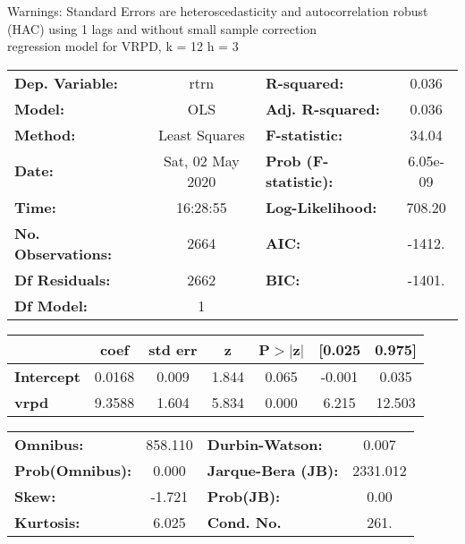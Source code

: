 Warnings: \newline
 [1] Standard Errors are heteroscedasticity and autocorrelation robust (HAC) using 1 lags and without small sample correction\\ 

regression model for VRPD, k = 12 h = 3\begin{center}
\begin{tabular}{lclc}
\toprule
\textbf{Dep. Variable:}    &       rtrn       & \textbf{  R-squared:         } &     0.036   \\
\textbf{Model:}            &       OLS        & \textbf{  Adj. R-squared:    } &     0.036   \\
\textbf{Method:}           &  Least Squares   & \textbf{  F-statistic:       } &     34.04   \\
\textbf{Date:}             & Sat, 02 May 2020 & \textbf{  Prob (F-statistic):} &  6.05e-09   \\
\textbf{Time:}             &     16:28:55     & \textbf{  Log-Likelihood:    } &    708.20   \\
\textbf{No. Observations:} &        2664      & \textbf{  AIC:               } &    -1412.   \\
\textbf{Df Residuals:}     &        2662      & \textbf{  BIC:               } &    -1401.   \\
\textbf{Df Model:}         &           1      & \textbf{                     } &             \\
\bottomrule
\end{tabular}
\begin{tabular}{lcccccc}
                   & \textbf{coef} & \textbf{std err} & \textbf{z} & \textbf{P$> |$z$|$} & \textbf{[0.025} & \textbf{0.975]}  \\
\midrule
\textbf{Intercept} &       0.0168  &        0.009     &     1.844  &         0.065        &       -0.001    &        0.035     \\
\textbf{vrpd}      &       9.3588  &        1.604     &     5.834  &         0.000        &        6.215    &       12.503     \\
\bottomrule
\end{tabular}
\begin{tabular}{lclc}
\textbf{Omnibus:}       & 858.110 & \textbf{  Durbin-Watson:     } &    0.007  \\
\textbf{Prob(Omnibus):} &   0.000 & \textbf{  Jarque-Bera (JB):  } & 2331.012  \\
\textbf{Skew:}          &  -1.721 & \textbf{  Prob(JB):          } &     0.00  \\
\textbf{Kurtosis:}      &   6.025 & \textbf{  Cond. No.          } &     261.  \\
\bottomrule
\end{tabular}
\end{center}

